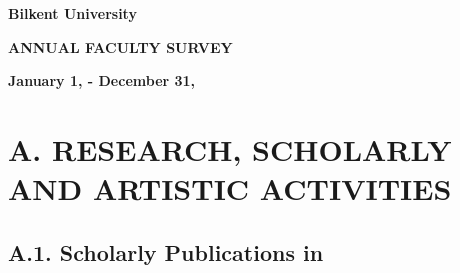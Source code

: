 \documentclass[10pt]{article}
\begin{document}
\thispagestyle{empty}

\begin{center}
\large {\bf Bilkent University} \\ \null 

\Large {\bf ANNUAL FACULTY SURVEY} \\ \null 

 {\bf January 1, \the\year - December 31, \the\year} \\ \null 

\end{center}



\clearpage

\section*{A. RESEARCH, SCHOLARLY AND ARTISTIC ACTIVITIES}

\subsection*{A.1. Scholarly Publications in \the\year}

\end{document}
